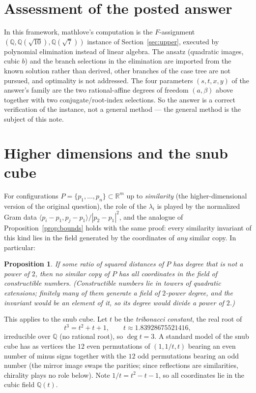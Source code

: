 \documentclass[11pt]{article}
\newtheorem{proposition}[theorem]{Proposition}
\theoremstyle{definition}
\theoremstyle{remark}
\newcommand{\Q}{\mathbb{Q}}
\newcommand{\R}{\mathbb{R}}
\begin{document}
\section{Assessment of the posted answer}\label{sec:assessment}

In this framework, mathlove's computation is the $F$-assignment
$(\Q, \Q(\sqrt{10}), \Q(\sqrt7))$ instance of Section~\ref{sec:upper}, executed by polynomial
elimination instead of linear algebra. The ansatz (quadratic images, cubic $b$) and the branch
selections in the elimination are imported from the known solution rather than derived, other
branches of the case tree are not pursued, and optimality is not addressed. The four
parameters $(s, t, x, y)$ of the answer's family are the two rational-affine degrees of
freedom $(a, \beta)$ above together with two conjugate/root-index selections. So the answer is
a correct verification of the instance, not a general method --- the general method is the
subject of this note.

\section{Higher dimensions and the snub cube}\label{sec:snub}

For configurations $P = \{p_1, \dots, p_n\} \subset \R^m$ up to \emph{similarity} (the
higher-dimensional version of the original question), the role of the $\lambda_i$ is played by
the normalized Gram data
$\langle p_i - p_1, p_j - p_1\rangle / |p_2 - p_1|^2$, and the analogue of
Proposition~\ref{prop:bounds} holds with the same proof: every similarity invariant of this
kind lies in the field generated by the coordinates of \emph{any} similar copy. In particular:

\begin{proposition}\label{prop:ndlower}
If some ratio of squared distances of $P$ has degree that is not a power of $2$, then no
similar copy of $P$ has all coordinates in the field of constructible numbers. (Constructible
numbers lie in towers of quadratic extensions; finitely many of them generate a field of
$2$-power degree, and the invariant would be an element of it, so its degree would divide a
power of $2$.)
\end{proposition}

This applies to the snub cube. Let $t$ be the \emph{tribonacci constant}, the real root of
\[
t^3 = t^2 + t + 1, \qquad t \approx 1.83928675521416,
\]
irreducible over $\Q$ (no rational root), so $\deg t = 3$. A standard model of the snub cube
has as vertices the $12$ even permutations of $(1, 1/t, t)$ bearing an even number of minus
signs together with the $12$ odd permutations bearing an odd number (the mirror image swaps
the parities; since reflections are similarities, chirality plays no role below). Note
$1/t = t^2 - t - 1$, so all coordinates lie in the cubic field $\Q(t)$.
\end{document}
